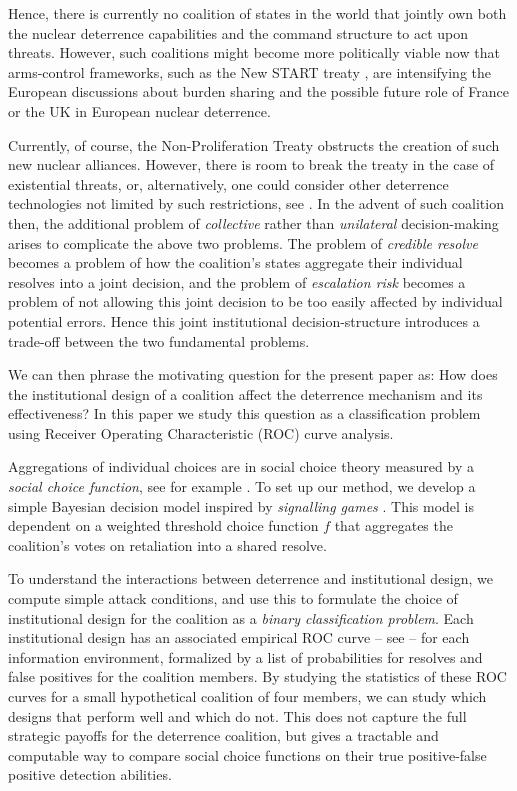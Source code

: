 Hence, there is currently no coalition of states in the world that jointly own both the nuclear deterrence capabilities and the command structure to act upon threats. However, such coalitions might become more politically viable now that arms-control frameworks, such as the New START treaty \parencite{NewSTART_2010}, are intensifying the European discussions about burden sharing and the possible future role of France or the UK in European nuclear deterrence. 

Currently, of course, the Non-Proliferation Treaty \parencite{NPT_1968} obstructs the creation of such new nuclear alliances. However, there is room to break the treaty in the case of existential threats, or, alternatively, one could consider other deterrence technologies not limited by such restrictions, see \cite{EuropeanNuclearPlanningGroup}. In the advent of such coalition then, the additional problem of \emph{collective} rather than \emph{unilateral} decision-making arises to complicate the above two problems. The problem of \emph{credible resolve} becomes a problem of how the coalition's states aggregate their individual resolves into a joint decision, and the problem of \emph{escalation risk} becomes a problem of not allowing this joint decision to be too easily affected by individual potential errors. Hence this joint institutional decision-structure introduces a trade-off between the two fundamental problems. 

We can then phrase the motivating question for the present paper as: How does the institutional design of a coalition affect the deterrence mechanism and its effectiveness? In this paper we study this question as a classification problem using Receiver Operating Characteristic (ROC) curve analysis.

Aggregations of individual choices are in social choice theory measured by a \emph{social choice function}, see for example \parencite{Arrow_1951, Moulin_1988}. To set up our method, we develop a simple Bayesian decision model inspired by \emph{signalling games} \parencite[Part IV]{Fudenberg-Tirole_1991}. This model is dependent on a weighted threshold choice function $f$ that aggregates the coalition's votes on retaliation into a shared resolve. 
 
To understand the interactions between deterrence and institutional design, we compute simple attack conditions, and use this to formulate the choice of institutional design for the coalition as a \emph{binary classification problem}. Each institutional design has an associated empirical ROC curve -- see \parencite{Fawcett_2006} -- for each information environment, formalized by a list of probabilities for resolves and false positives for the coalition members. By studying the statistics of these ROC curves for a small hypothetical coalition of four members, we can study which designs that perform well and which do not. This does not capture the full strategic payoffs for the deterrence coalition, but gives a tractable and computable way to compare social choice functions on their true positive-false positive detection abilities. 

